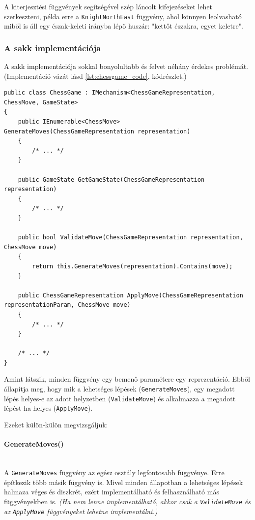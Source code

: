\documentclass[twoside, a4paper, 12pt]{article}
\begin{document}
A kiterjesztési függvények segítségével szép láncolt kifejezéseket lehet szerkeszteni, példa erre a \texttt{KnightNorthEast} függvény, ahol könnyen leolvasható miből is áll egy észak-keleti irányba lépő huszár: "kettőt északra, egyet keletre".

\subsubsection{A sakk implementációja}

A sakk implementációja sokkal bonyolultabb és felvet néhány érdekes problémát. (Implementáció vázát lásd \ref{lst:chessgame_code}, kódrészlet.)

\begin{lstlisting}[caption=Sakk szabályok implementációja, label=lst:chessgame_code]
public class ChessGame : IMechanism<ChessGameRepresentation, ChessMove, GameState>
{
	public IEnumerable<ChessMove> GenerateMoves(ChessGameRepresentation representation)
	{ 
		/* ... */ 
	}
	
	public GameState GetGameState(ChessGameRepresentation representation)
	{ 
		/* ... */ 
	}
	
	public bool ValidateMove(ChessGameRepresentation representation, ChessMove move)
	{
		return this.GenerateMoves(representation).Contains(move);
	}
	
	public ChessGameRepresentation ApplyMove(ChessGameRepresentation representationParam, ChessMove move)
	{ 
		/* ... */ 
	}
	
	/* ... */
}
\end{lstlisting}

Amint látszik, minden függvény egy bemenő paramétere egy reprezentáció. Ebből állapítja meg, hogy mik a lehetséges lépések (\texttt{GenerateMoves}), egy megadott lépés helyes-e az adott helyzetben (\texttt{ValidateMove}) és alkalmazza a megadott lépést ha helyes (\texttt{ApplyMove}).

Ezeket külön-külön megvizsgáljuk:

\paragraph{GenerateMoves()} \mbox{} \\
A \texttt{GenerateMoves} függvény az egész osztály legfontosabb függvénye. Erre építkezik több másik függvény is. Mivel minden állapotban a lehetséges lépések halmaza véges és diszkrét, ezért implementálható és felhasználható más függvényekben is. \textit{(Ha nem lenne implementálható, akkor csak a \texttt{ValidateMove} és az \texttt{ApplyMove} függvényeket lehetne implementálni.)}
\end{document}

